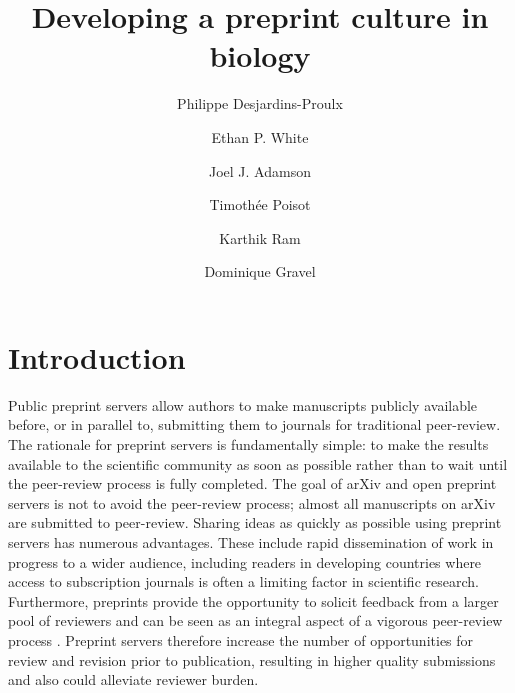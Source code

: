 \documentclass[letterpaper,twocolumn,superscriptaddress,showkeys]{revtex4-1}
\begin{document}
\title{Developing a preprint culture in biology}

\author{Philippe Desjardins-Proulx}

\author{Ethan P. White}

\author{Joel J. Adamson}

\author{Timoth\'ee Poisot}

\author{Karthik Ram}

\author{Dominique Gravel}


\maketitle

\section{Introduction}

Public preprint servers allow authors to make manuscripts publicly available
before, or in parallel to, submitting them to journals for traditional
peer-review. The rationale for preprint servers is fundamentally simple: to make
the results available to the scientific community as soon as possible rather
than to wait until the peer-review process is fully completed. The goal of arXiv
and open preprint servers is not to avoid the peer-review process; almost all
manuscripts on arXiv are submitted to peer-review.  Sharing ideas as quickly as
possible using preprint servers has numerous advantages.  These include rapid
dissemination of work in progress to a wider audience, including readers in
developing countries where access to subscription journals is often a limiting
factor in scientific research.  Furthermore, preprints provide the opportunity
to solicit feedback from a larger pool of reviewers and can be seen as an
integral aspect of a vigorous peer-review process \cite{hoc12}.  Preprint
servers therefore increase the number of opportunities for review and revision
prior to publication, resulting in higher quality submissions and also could
alleviate reviewer burden.
\end{document}
